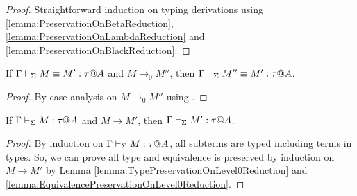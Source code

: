 \begin{proof}
    Straightforward induction on typing derivations using
    \ref{lemma:PreservationOnBetaReduction},
    \ref{lemma:PreservationOnLambdaReduction} and
    \ref{lemma:PreservationOnBlackReduction}.
\end{proof}

\begin{lemma}
    \label{lemma:EquivalencePreservationOnLevel0Reduction}
    If \( \Gamma \vdash_\Sigma M \equiv M' : \tau @ A \) and \( M \longrightarrow_0 M'' \), then \( \Gamma \vdash_\Sigma M'' \equiv M' : \tau @ A \).
\end{lemma}

\begin{proof}
    By case analysis on \( M \longrightarrow_0 M'' \) using \QTrans.
\end{proof}

\begin{theorem}
    \label{theorem:TypePreservation}
    If \( \Gamma \vdash_\Sigma M : \tau @ A \) and \( M \longrightarrow M' \), then \( \Gamma \vdash_\Sigma M' : \tau @ A \).
\end{theorem}

\begin{proof} 
    By induction on \( \Gamma \vdash_\Sigma M : \tau @ A \), all subterms are typed including
    terms in types. So, we can prove all type and equivalence is preserved by
    induction on \( M \longrightarrow M' \) by Lemma
    \ref{lemma:TypePreservationOnLevel0Reduction} and
    \ref{lemma:EquivalencePreservationOnLevel0Reduction}.
\end{proof}

